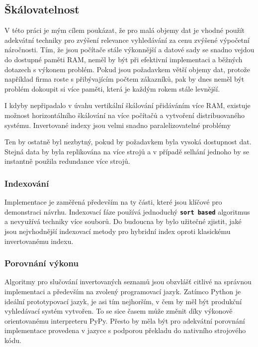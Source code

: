 \documentclass[11pt,letterpaper,oneside,openright]{book}
\newcommand{\bftt}[1]{\texttt{\textbf{#1}}}
\begin{document}
\subsection{Škálovatelnost}
V této práci je mým cílem poukázat, že pro malá objemy dat je vhodné použít
adekvátní techniky pro zvýšení relevance vyhledávání za cenu zvýšené výpočetní
náročnosti. Tím, že jsou počítače stále výkonnější a datové sady se snadno
vejdou do dostupné paměti RAM, neměl by být při efektivní implementaci a
běžných dotazech s výkonem problém. Pokud jsou požadavkem větší objemy dat,
protože například firma roste s přibývajícím počtem zákazníků, pak by dnes
neměl být problém dokoupit si více paměti, která je každým rokem stále levnější.

I kdyby nepřipadalo v úvahu vertikální škálování přidáváním více RAM, existuje
možnost horizontálního škálování na více počítačů a vytvoření distribuovaného
systému. Invertované indexy jsou velmi snadno paralelizovatelné problémy

Ten by ostatně byl nezbytný, pokud by požadavkem byla vysoká
dostupnost dat. Stejná data by byla replikována na více strojů a v případě
selhání jednoho by se instantně použila redundance více strojů.



\subsubsection{Indexování}
Implementace je zaměřená především na ty části, které jsou klíčové pro
demonstraci návrhu. Indexovací fáze používá jednoduchý \bftt{sort based}
algoritmus a nevyužívá techniky více souborů. Do budoucna by bylo užitečné
zjistit, jaké jsou nejvhodnější indexovací metody pro hybridní index oproti
klasickému invertovanému indexu.

\subsubsection{Porovnání výkonu}
Algoritmy pro slučování invertovaných seznamů jsou obzvlášť citlivé na správnou
implementaci a především na zvolený programovací jazyk. Zatímco Python je
ideální prototypovací jazyk, je asi tím nejhorším, v čem by měl být produkční
vyhledávací systém vytvořen. To se sice časem může změnit díky výkonově
orientovanému interpreteru PyPy. Přesto by měla být pro adekvátní porovnání
implementace provedena v jazyce s podporou překladu do nativního strojového
kódu.
\end{document}
